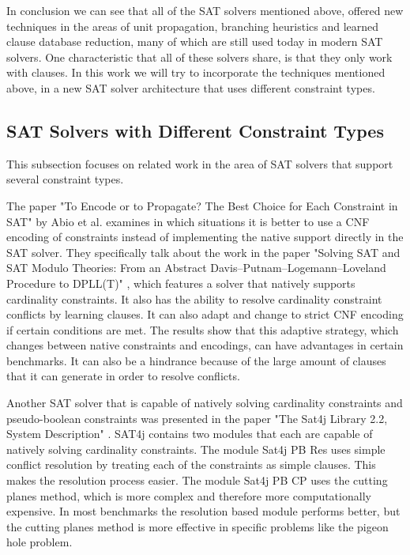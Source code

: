\documentclass{easychair}
\begin{document}
In conclusion we can see that all of the SAT solvers mentioned above, offered new techniques in the areas of unit propagation, branching heuristics and learned clause database reduction, many of which are still used today in modern SAT solvers. One characteristic that all of these solvers share, is that they only work with clauses. In this work we will try to incorporate the techniques mentioned above, in a new SAT solver architecture that uses different constraint types.

\subsection{SAT Solvers with Different Constraint Types}
This subsection focuses on related work in the area of SAT solvers that support several constraint types.

The paper "To Encode or to Propagate? The Best Choice for Each Constraint in SAT" \cite{abio2013encode} by Abio et al. examines in which situations it is better to use a CNF encoding of constraints instead of implementing the native support directly in the SAT solver. They specifically talk about the work in the paper "Solving SAT and SAT Modulo Theories: From an Abstract
Davis–Putnam–Logemann–Loveland Procedure to DPLL(T)" \cite{nieuwenhuis2006solving}, which features a solver that natively supports cardinality constraints. It also has the ability to resolve cardinality constraint conflicts by learning clauses. It can also adapt and change to strict CNF encoding if certain conditions are met. The results show that this adaptive strategy, which changes between native constraints and encodings, can have advantages in certain benchmarks. It can also be a hindrance because of the large amount of clauses that it can generate in order to resolve conflicts.

Another SAT solver that is capable of natively solving cardinality constraints and pseudo-boolean constraints was presented in the paper "The Sat4j Library 2.2, System Description" \cite{le2010sat4j}. SAT4j contains two modules that each are capable of natively solving cardinality constraints. The module Sat4j PB Res uses simple conflict resolution by treating each of the constraints as simple clauses. This makes the resolution process easier. The module Sat4j PB CP uses the cutting planes method, which is more complex and therefore more computationally expensive. In most benchmarks the resolution based module performs better, but the cutting planes method is more effective in specific problems like the pigeon hole problem.
\end{document}
